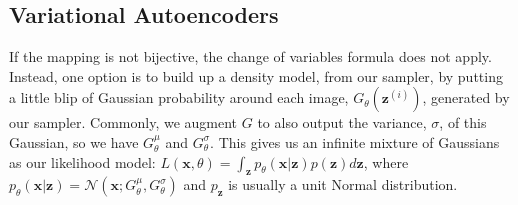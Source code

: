 
\subsection{Variational Autoencoders}

If the mapping is not bijective, the change of variables formula does not apply. Instead, one option is to build up a density model, from our sampler, by putting a little blip of Gaussian probability around each image, $G_{\theta}(\mathbf{z}^{(i)})$, generated by our sampler. Commonly, we augment $G$ to also output the variance, $\sigma$, of this Gaussian, so we have $G^{\mu}_{\theta}$ and $G^{\sigma}_{\theta}$. This gives us an infinite mixture of Gaussians as our likelihood model: $L(\mathbf{x}, \theta) = \int_{\mathbf{z}} p_{\theta}(\mathbf{x} | \mathbf{z})p(\mathbf{z})d\mathbf{z}$, where $p_{\theta}(\mathbf{x} | \mathbf{z}) = \mathcal{N}(\mathbf{x}; G_{\theta}^{\mu}, G_{\theta}^{\sigma})$ and $p_{\mathbf{z}}$ is usually a unit Normal distribution.



